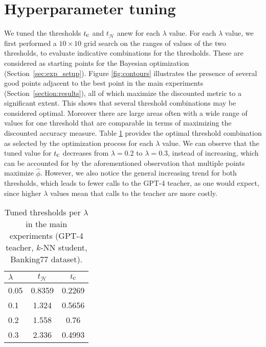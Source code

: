 \documentclass[11pt]{article}
\begin{document}
\section{Hyperparameter tuning} \label{sec:tuning}
We tuned the thresholds $t_{\textrm{\small c}}$ and  $t_\mathcal{H}$ anew for each $\lambda$ value. For each $\lambda$ value, we first performed a $10\times 10$ grid search on the ranges of values of the two thresholds, to evaluate indicative combinations for the thresholds. These are considered as starting points for the Bayesian optimization (Section~\ref{sec:exp_setup}). 
Figure \ref{fig:contours} illustrates the presence of several good points adjacent to the best point in the main experiments (Section~\ref{section:results}), all of which maximize the discounted metric to a significant extent. This shows that several threshold combinations may be considered optimal. Moreover there are large areas often with a wide range of values for one threshold that are comparable in terms of maximizing the discounted accuracy measure. Table \ref{tab:threshold_pel_l} provides the optimal threshold combination as selected by the optimization process for each $\lambda$ value. We can observe that the tuned value for $t_{\textrm{\small c}}$ decreases from $\lambda = 0.2$ to $\lambda = 0.3$, instead of increasing, which can be accounted for by the aforementioned observation that multiple points maximize $\hat{\phi}$. However, we also notice the general increasing trend for both thresholds, which leads to fewer calls to the GPT-4 teacher, as one would expect, since higher $\lambda$ values mean that calls to the teacher are more costly.

\begin{table}[!h]
\centering
\small
    \begin{tabular}{|l|c|c|}
    \hline
    \textbf{$\lambda$} & \textbf{$t_\mathcal{H}$} & $t_{\textrm{\small c}}$ \\
    \hline
        0.05 & 0.8359 & 0.2269\\
        0.1 & 1.324 & 0.5656 \\
        0.2 & 1.558 & 0.76 \\
        0.3 & 2.336 & 0.4993 \\
    \hline
    \end{tabular}
    \vspace{-1mm}
\caption{Tuned thresholds per \(\lambda\) in the main experiments (GPT-4 teacher, $k$-NN student, Banking77 dataset).}
\label{tab:threshold_pel_l}
\vspace{-1em}
\end{table}
\end{document}
